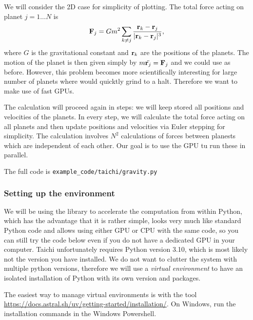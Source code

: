 We will consider the 2D case for simplicity of plotting. The total force acting on planet $j = 1\dots N$ is
\begin{equation}
    \bv F_j = Gm^2\sum_{k\neq j}\frac{\bv r_k - \bv r_j}{|\bv r_k - \bv r_j|^3}, %
\end{equation}
where $G$ is the gravitational constant and $\mathbf{r}_k$ are the positions of the planets. The motion of the planet is then given simply by $m\ddot{\mathbf{r}_j} = \mathbf{F}_j$ and we could use  as before. However, this problem becomes more scientifically interesting for large number of planets where  would quicktly grind to a halt. Therefore we want to make use of fast GPUs.

The calculation will proceed again in steps: we will keep stored all positions and velocities of the planets. In every step, we will calculate the total force acting on all planets and then update positions and velocities via Euler stepping for simplicity. The calculation involves $N^2$ calculations of forces between planests which are independent of each other. Our goal is to use the GPU tu run these in parallel.

The full code is \verb|example_code/taichi/gravity.py|

\subsubsection{Setting up the environment}
We will be using the  library to accelerate the computation from within Python, which has the advantage that it is rather simple, looks very much like standard Python code and allows using either GPU or CPU with the same code, so you can still try the code below even if you do not have a dedicated GPU in your computer. Taichi unfortunately requires Python version 3.10, which is most likely not the version you have installed. We do not want to clutter the system with multiple python versions, therefore we will use a \emph{virtual environment} to have an isolated installation of Python with its own version and packages.

The easiest way to manage virtual environments is with the  tool \url{https://docs.astral.sh/uv/getting-started/installation/}. On Windows, run the installation commands in the Windows Powershell.

